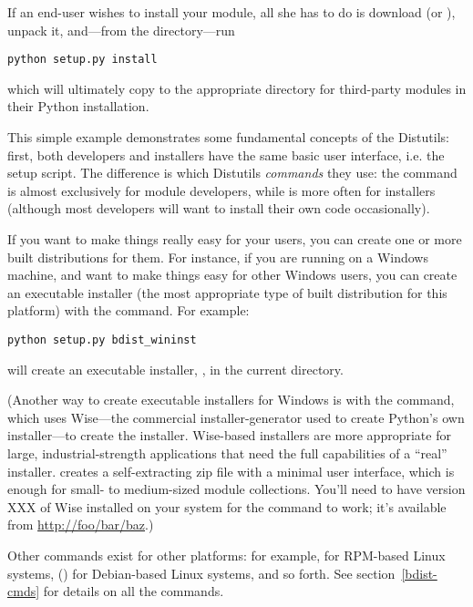 \documentclass{howto}
\begin{document}
If an end-user wishes to install your  module, all she has
to do is download  (or ), unpack it,
and---from the  directory---run
\begin{verbatim}
python setup.py install
\end{verbatim}
which will ultimately copy  to the appropriate directory
for third-party modules in their Python installation.

This simple example demonstrates some fundamental concepts of the
Distutils: first, both developers and installers have the same basic
user interface, i.e. the setup script.  The difference is which
Distutils \emph{commands} they use: the  command is
almost exclusively for module developers, while  is
more often for installers (although most developers will want to install
their own code occasionally).

%
If you want to make things really easy for your users, you can create
one or more built distributions for them.  For instance, if you are
running on a Windows machine, and want to make things easy for other
Windows users, you can create an executable installer (the most
appropriate type of built distribution for this platform) with the
 command.  For example:
\begin{verbatim}
python setup.py bdist_wininst
\end{verbatim}
will create an executable installer, , in the current
directory.

(Another way to create executable installers for Windows is with the
 command, which uses Wise---the commercial
installer-generator used to create Python's own installer---to create
the installer.  Wise-based installers are more appropriate for large,
industrial-strength applications that need the full capabilities of a
``real'' installer.   creates a self-extracting
zip file with a minimal user interface, which is enough for small- to
medium-sized module collections.  You'll need to have version XXX of
Wise installed on your system for the  command to
work; it's available from \url{http://foo/bar/baz}.)

Other  commands exist for other platforms: for example,
 for RPM-based Linux systems, ()
for Debian-based Linux systems, and so forth.  See
section~\ref{bdist-cmds} for details on all the 
commands.
\end{document}
